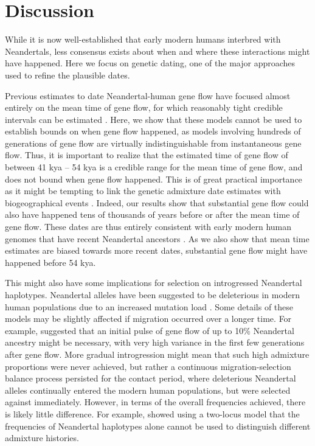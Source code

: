 \documentclass[]{article}
\begin{document}
\section{Discussion}\label{discussion}
While it is now well-established that early modern humans interbred with Neandertals, less consensus exists about when and where these interactions might have happened. Here we focus on genetic dating, one of the major approaches used to refine the plausible dates.

Previous estimates to date Neandertal-human gene flow have focused almost entirely on the mean time of gene flow, for which reasonably tight credible intervals can be estimated \citep{green_draft_2010, sankararaman_date_2012}. Here, we show that these models cannot be used to establish bounds on when gene flow happened, as models involving hundreds of generations of gene flow are virtually indistinguishable from instantaneous gene flow. Thus, it is important to realize that the estimated time of gene flow of between 41 kya -- 54 kya \citep{moorjani_genetic_2016} is a credible range for the mean time of gene flow, and does not bound when gene flow happened. This is of great practical importance as it might be tempting to link the genetic admixture date estimates with biogeographical events \citep{sankararaman_date_2012,lazaridis_genomic_2016,jacobs_multiple_2019,vyas_analyses_2019,douka_age_2019}. Indeed, our results show that substantial gene flow could also have happened tens of thousands of years before or after the mean time of gene flow. These dates are thus entirely consistent with early modern human genomes that have recent Neandertal ancestors \cite{fu_genome_2014, hajdinjak_bk_paper}. As we also show that mean time estimates are biased towards more recent dates, substantial gene flow might have happened before 54 kya. 

This might also have some implications for selection on introgressed Neandertal haplotypes. Neandertal alleles have been suggested to be deleterious in modern human populations due to an increased mutation load \citep{harris_genetic_2016, juric_strength_2016}. Some details of these models may be slightly affected if migration occurred over a longer time. For example, \citep{harris_genetic_2016} suggested that an initial pulse of gene flow of up to 10\% Neandertal ancestry might be necessary, with very high variance in the first few generations after gene flow. More gradual introgression might mean that such high admixture proportions were never achieved, but rather a continuous migration-selection balance process persisted for the contact period, where deleterious Neandertal alleles continually entered the modern human populations, but were selected against immediately. 
However, in terms of the overall frequencies achieved, there is likely little difference. For example, \cite{juric_strength_2016} showed using a two-locus model that the frequencies of Neandertal haplotypes alone cannot be used to distinguish different admixture histories.
\end{document}
